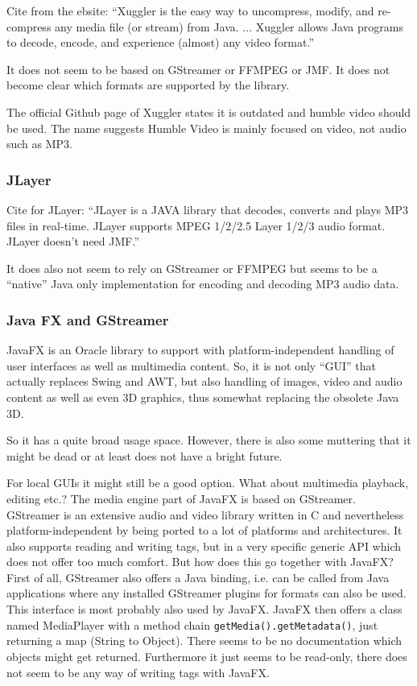 Cite from the ebsite: ``Xuggler is the easy way to uncompress, modify, and re-compress any media file (or stream) from Java. ... Xuggler allows Java programs to decode, encode, and experience (almost) any video format.''

It does not seem to be based on GStreamer or FFMPEG or JMF. It does not become clear which formats are supported by the library.

The official Github page of Xuggler states it is outdated and humble video should be used. The name suggests Humble Video is mainly focused on video, not audio such as MP3.

\subsubsection{JLayer}%
\label{sec:JLayer}%

Cite for JLayer: ``JLayer is a JAVA library that decodes, converts and plays MP3 files in real-time. JLayer supports MPEG 1/2/2.5 Layer 1/2/3 audio format. JLayer doesn't need JMF.''

It does also not seem to rely on GStreamer or FFMPEG but seems to be a ``native'' Java only implementation for encoding and decoding MP3 audio data.

\subsubsection{Java FX and GStreamer}%
\label{sec:JavaFX}%

JavaFX is an Oracle library to support with platform-independent handling of user interfaces as well as multimedia content. So, it is not only ``GUI'' that actually replaces Swing and AWT, but also handling of images, video and audio content as well as even 3D graphics, thus somewhat replacing the obsolete Java 3D.

So it has a quite broad usage space. However, there is also some muttering that it might be dead or at least does not have a bright future.

For local GUIs it might still be a good option. What about multimedia playback, editing etc.? The media engine part of JavaFX is based on GStreamer. GStreamer is an extensive audio and video library written in C and nevertheless platform-independent by being ported to a lot of platforms and architectures. It also supports reading and writing tags, but in a very specific generic API which does not offer too much comfort. But how does this go together with JavaFX? First of all, GStreamer also offers a Java binding, i.e. can be called from Java applications where any installed GStreamer plugins for formats can also be used. This interface is most probably also used by JavaFX. JavaFX then offers a class named MediaPlayer with a method chain \texttt{getMedia().getMetadata()}, just returning a map (String to Object). There seems to be no documentation which objects might get returned. Furthermore it just seems to be read-only, there does not seem to be any way of writing tags with JavaFX.

